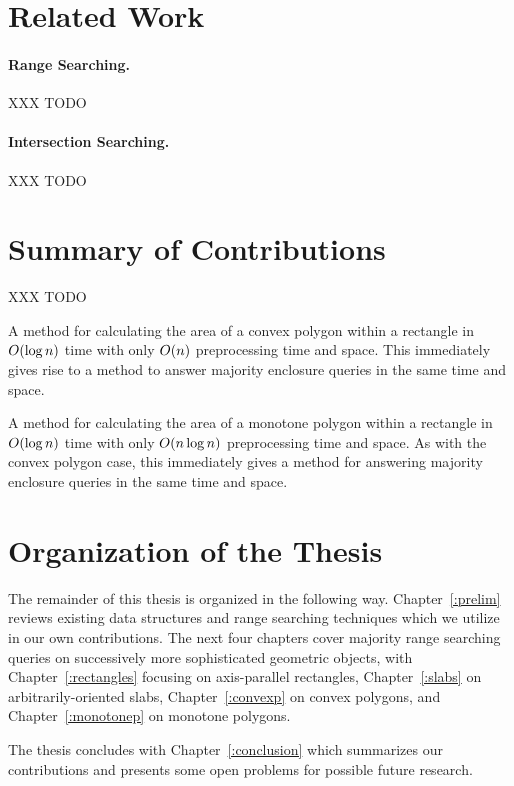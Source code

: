 \section{Related Work}
\label{:intro:related}

\paragraph{Range Searching.} 
XXX TODO

\paragraph{Intersection Searching.} 
XXX TODO


\section{Summary of Contributions}
\label{:introduction:contributions}

XXX TODO

A method for calculating the area of a convex polygon within a rectangle in $O\!\left(\log{n}\right)$ time with only
$O\!\left(n\right)$ preprocessing time and space. This immediately gives rise to a method to answer majority enclosure queries in the same time and space.

A method for calculating the area of a monotone polygon within a rectangle in $O\!\left(\log{n}\right)$ time with only
$O\!\left(n \log{n}\right)$ preprocessing time and space. As with the convex polygon case, this immediately gives a method for answering majority enclosure queries in the same time and space.


\section{Organization of the Thesis}
\label{:introduction:organization}

The remainder of this thesis is organized in the following way. 
Chapter~\ref{:prelim} reviews existing data structures and range searching techniques which we utilize in our own contributions.
The next four chapters cover majority range searching queries on successively more sophisticated geometric objects, with Chapter~\ref{:rectangles} focusing on axis-parallel rectangles, Chapter~\ref{:slabs} on arbitrarily-oriented slabs, Chapter~\ref{:convexp} on convex polygons, and Chapter~\ref{:monotonep} on monotone polygons.

The thesis concludes with Chapter~\ref{:conclusion} which summarizes our contributions and presents some open problems for possible future research.



